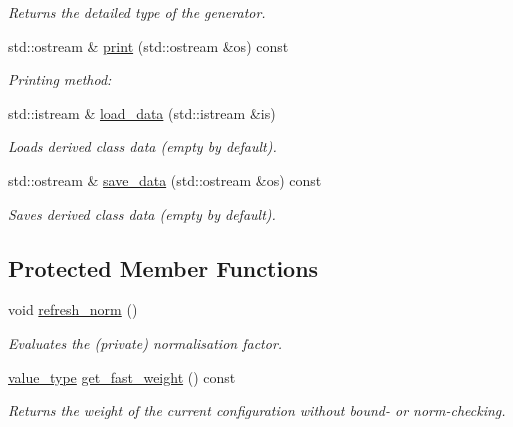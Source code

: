\begin{DoxyCompactItemize}
\begin{DoxyCompactList}\small\item\em Returns the detailed type of the generator. \end{DoxyCompactList}\item 
\hypertarget{a00001_a7d4a9a3ad7c7f1e076a890201a963e5f}{std\-::ostream \& \hyperlink{a00001_a7d4a9a3ad7c7f1e076a890201a963e5f}{print} (std\-::ostream \&os) const }\label{a00001_a7d4a9a3ad7c7f1e076a890201a963e5f}

\begin{DoxyCompactList}\small\item\em Printing method\-: \end{DoxyCompactList}\item 
\hypertarget{a00001_a109612e2e98a9ad3ee9dbd6d3a87c994}{std\-::istream \& \hyperlink{a00001_a109612e2e98a9ad3ee9dbd6d3a87c994}{load\-\_\-data} (std\-::istream \&is)}\label{a00001_a109612e2e98a9ad3ee9dbd6d3a87c994}

\begin{DoxyCompactList}\small\item\em Loads derived class data (empty by default). \end{DoxyCompactList}\item 
\hypertarget{a00001_a2ee0363b66b4a867bd5afc8b0a692fc0}{std\-::ostream \& \hyperlink{a00001_a2ee0363b66b4a867bd5afc8b0a692fc0}{save\-\_\-data} (std\-::ostream \&os) const }\label{a00001_a2ee0363b66b4a867bd5afc8b0a692fc0}

\begin{DoxyCompactList}\small\item\em Saves derived class data (empty by default). \end{DoxyCompactList}\end{DoxyCompactItemize}
\subsection*{Protected Member Functions}
\begin{DoxyCompactItemize}
\item 
\hypertarget{a00001_a35687e41f6569b3e20e614a7662c3bc5}{void \hyperlink{a00001_a35687e41f6569b3e20e614a7662c3bc5}{refresh\-\_\-norm} ()}\label{a00001_a35687e41f6569b3e20e614a7662c3bc5}

\begin{DoxyCompactList}\small\item\em Evaluates the (private) normalisation factor. \end{DoxyCompactList}\item 
\hyperlink{a00362_a3353150105036deac9bde097cbf1d8af}{value\-\_\-type} \hyperlink{a00001_ad6ffaf02a5104ed5c403811f75092be2}{get\-\_\-fast\-\_\-weight} () const 
\begin{DoxyCompactList}\small\item\em Returns the weight of the current configuration without bound-\/ or norm-\/checking. \end{DoxyCompactList}\end{DoxyCompactItemize}
